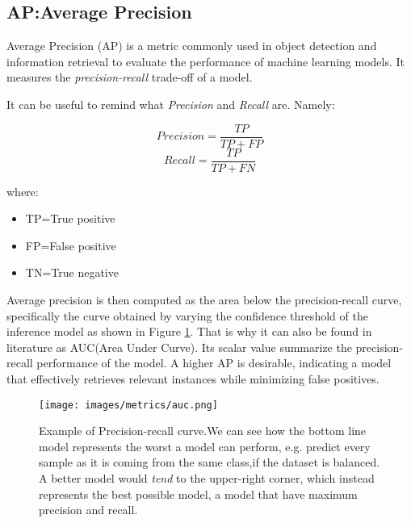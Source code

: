 \subsection{AP:Average Precision}
Average Precision (AP) is a metric commonly used in object detection and information retrieval
to evaluate the performance of machine learning models. It measures the \textit{precision-recall} trade-off of a model.

It can be useful to remind what \textit{Precision} and \textit{Recall} are. Namely:

\begin{equation}
    Precision=\frac{TP}{TP+FP}
\end{equation}
\begin{equation}
    Recall=\frac{TP}{TP+FN}
\end{equation}

where:
\begin{itemize}
    \item TP=True positive
    \item FP=False positive
    \item TN=True negative
\end{itemize}
Average precision is then computed as the area below the precision-recall curve, specifically
the curve obtained by varying the confidence threshold of the inference model as shown
in Figure \ref{fig:auc}. That is why 
it can also be found in literature as AUC(Area Under Curve).
Its scalar value summarize the precision-recall performance of the model.
A higher AP is desirable, indicating a model that effectively retrieves 
relevant instances while minimizing false positives.

\begin{figure}
    \centering
    \texttt{[image: images/metrics/auc.png]} %
    \caption{Example of Precision-recall curve.We can see how the bottom line model 
        represents the worst a model can perform, e.g. predict every sample as it is 
        coming from the same class,if the dataset is balanced. A better model would
        \textit{tend} to the upper-right corner, which instead represents the best
        possible model, a model that have maximum precision and recall.}\label{fig:auc}
\end{figure}